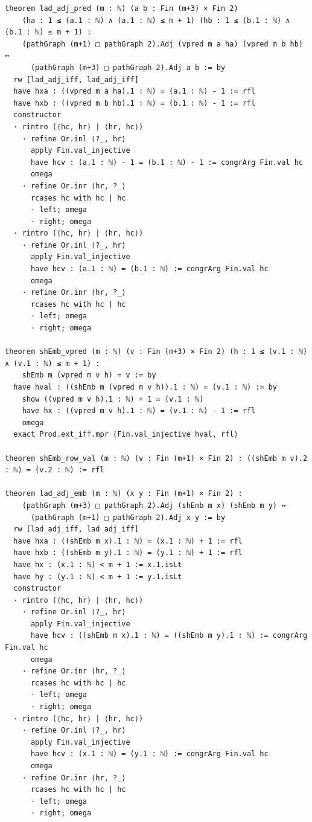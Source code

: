 \documentclass[11pt]{article}
\begin{document}
\begin{lstlisting}
theorem lad_adj_pred (m : ℕ) (a b : Fin (m+3) × Fin 2)
    (ha : 1 ≤ (a.1 : ℕ) ∧ (a.1 : ℕ) ≤ m + 1) (hb : 1 ≤ (b.1 : ℕ) ∧ (b.1 : ℕ) ≤ m + 1) :
    (pathGraph (m+1) □ pathGraph 2).Adj (vpred m a ha) (vpred m b hb) ↔
      (pathGraph (m+3) □ pathGraph 2).Adj a b := by
  rw [lad_adj_iff, lad_adj_iff]
  have hxa : ((vpred m a ha).1 : ℕ) = (a.1 : ℕ) - 1 := rfl
  have hxb : ((vpred m b hb).1 : ℕ) = (b.1 : ℕ) - 1 := rfl
  constructor
  · rintro (⟨hc, hr⟩ | ⟨hr, hc⟩)
    · refine Or.inl ⟨?_, hr⟩
      apply Fin.val_injective
      have hcv : (a.1 : ℕ) - 1 = (b.1 : ℕ) - 1 := congrArg Fin.val hc
      omega
    · refine Or.inr ⟨hr, ?_⟩
      rcases hc with hc | hc
      · left; omega
      · right; omega
  · rintro (⟨hc, hr⟩ | ⟨hr, hc⟩)
    · refine Or.inl ⟨?_, hr⟩
      apply Fin.val_injective
      have hcv : (a.1 : ℕ) = (b.1 : ℕ) := congrArg Fin.val hc
      omega
    · refine Or.inr ⟨hr, ?_⟩
      rcases hc with hc | hc
      · left; omega
      · right; omega

theorem shEmb_vpred (m : ℕ) (v : Fin (m+3) × Fin 2) (h : 1 ≤ (v.1 : ℕ) ∧ (v.1 : ℕ) ≤ m + 1) :
    shEmb m (vpred m v h) = v := by
  have hval : ((shEmb m (vpred m v h)).1 : ℕ) = (v.1 : ℕ) := by
    show ((vpred m v h).1 : ℕ) + 1 = (v.1 : ℕ)
    have hx : ((vpred m v h).1 : ℕ) = (v.1 : ℕ) - 1 := rfl
    omega
  exact Prod.ext_iff.mpr ⟨Fin.val_injective hval, rfl⟩

theorem shEmb_row_val (m : ℕ) (v : Fin (m+1) × Fin 2) : ((shEmb m v).2 : ℕ) = (v.2 : ℕ) := rfl

theorem lad_adj_emb (m : ℕ) (x y : Fin (m+1) × Fin 2) :
    (pathGraph (m+3) □ pathGraph 2).Adj (shEmb m x) (shEmb m y) ↔
      (pathGraph (m+1) □ pathGraph 2).Adj x y := by
  rw [lad_adj_iff, lad_adj_iff]
  have hxa : ((shEmb m x).1 : ℕ) = (x.1 : ℕ) + 1 := rfl
  have hxb : ((shEmb m y).1 : ℕ) = (y.1 : ℕ) + 1 := rfl
  have hx : (x.1 : ℕ) < m + 1 := x.1.isLt
  have hy : (y.1 : ℕ) < m + 1 := y.1.isLt
  constructor
  · rintro (⟨hc, hr⟩ | ⟨hr, hc⟩)
    · refine Or.inl ⟨?_, hr⟩
      apply Fin.val_injective
      have hcv : ((shEmb m x).1 : ℕ) = ((shEmb m y).1 : ℕ) := congrArg Fin.val hc
      omega
    · refine Or.inr ⟨hr, ?_⟩
      rcases hc with hc | hc
      · left; omega
      · right; omega
  · rintro (⟨hc, hr⟩ | ⟨hr, hc⟩)
    · refine Or.inl ⟨?_, hr⟩
      apply Fin.val_injective
      have hcv : (x.1 : ℕ) = (y.1 : ℕ) := congrArg Fin.val hc
      omega
    · refine Or.inr ⟨hr, ?_⟩
      rcases hc with hc | hc
      · left; omega
      · right; omega


\end{lstlisting}
\end{document}
